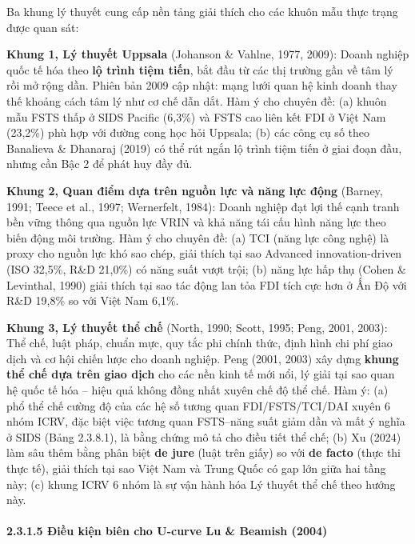 \documentclass[
  a4paper,
  13pt]{extreport}
\begin{document}
Ba khung lý thuyết cung cấp nền tảng giải thích cho các khuôn mẫu thực
trạng được quan sát:

\textbf{Khung 1, Lý thuyết Uppsala} (Johanson \& Vahlne, 1977, 2009):
Doanh nghiệp quốc tế hóa theo \textbf{lộ trình tiệm tiến}, bắt đầu từ
các thị trường gần về tâm lý rồi mở rộng dần. Phiên bản 2009 cập nhật:
mạng lưới quan hệ kinh doanh thay thế khoảng cách tâm lý như cơ chế dẫn
dắt. Hàm ý cho chuyên đề: (a) khuôn mẫu FSTS thấp ở SIDS Pacific (6,3\%)
và FSTS cao liên kết FDI ở Việt Nam (23,2\%) phù hợp với đường cong học
hỏi Uppsala; (b) các công cụ số theo Banalieva \& Dhanaraj (2019) có thể
rút ngắn lộ trình tiệm tiến ở giai đoạn đầu, nhưng cần Bậc 2 để phát huy
đầy đủ.

\textbf{Khung 2, Quan điểm dựa trên nguồn lực và năng lực động} (Barney,
1991; Teece et al., 1997; Wernerfelt, 1984): Doanh nghiệp đạt lợi thế
cạnh tranh bền vững thông qua nguồn lực VRIN và khả năng tái cấu hình
năng lực theo biến động môi trường. Hàm ý cho chuyên đề: (a) TCI (năng
lực công nghệ) là proxy cho nguồn lực khó sao chép, giải thích tại sao
Advanced innovation-driven (ISO 32,5\%, R\&D 21,0\%) có năng suất vượt
trội; (b) năng lực hấp thụ (Cohen \& Levinthal, 1990) giải thích tại sao
tác động lan tỏa FDI tích cực hơn ở Ấn Độ với R\&D 19,8\% so với Việt
Nam 6,1\%.

\textbf{Khung 3, Lý thuyết thể chế} (North, 1990; Scott, 1995; Peng,
2001, 2003): Thể chế, luật pháp, chuẩn mực, quy tắc phi chính thức, định
hình chi phí giao dịch và cơ hội chiến lược cho doanh nghiệp. Peng
(2001, 2003) xây dựng \textbf{khung thể chế dựa trên giao dịch} cho các
nền kinh tế mới nổi, lý giải tại sao quan hệ quốc tế hóa -- hiệu quả
không đồng nhất xuyên chế độ thể chế. Hàm ý: (a) phổ thể chế cường độ
của các hệ số tương quan FDI/FSTS/TCI/DAI xuyên 6 nhóm ICRV, đặc biệt
việc tương quan FSTS--năng suất giảm dần và mất ý nghĩa ở SIDS (Bảng
2.3.8.1), là bằng chứng mô tả cho điều tiết thể chế; (b) Xu (2024) làm
sâu thêm bằng phân biệt \textbf{de jure} (luật trên giấy) so với
\textbf{de facto} (thực thi thực tế), giải thích tại sao Việt Nam và
Trung Quốc có gap lớn giữa hai tầng này; (c) khung ICRV 6 nhóm là sự vận
hành hóa Lý thuyết thể chế theo hướng này.

\hypertarget{ux111iux1ec1u-kiux1ec7n-biuxean-cho-u-curve-lu-beamish-2004}{%
\paragraph{2.3.1.5 Điều kiện biên cho U-curve Lu \& Beamish
(2004)}\label{ux111iux1ec1u-kiux1ec7n-biuxean-cho-u-curve-lu-beamish-2004}}
\end{document}
